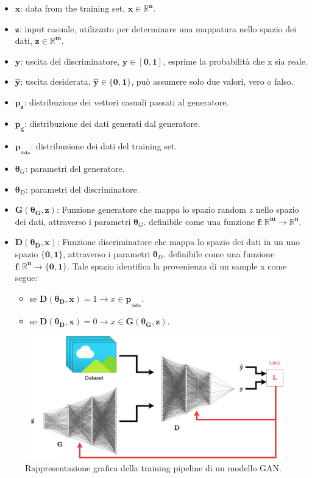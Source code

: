 \begin{itemize}
    \item $\mathbf{x}$: data from the training set, $\mathbf{x \in \mathbb{R}^n}$.
    \item $\mathbf{z}$: input casuale, utilizzato per determinare una mappatura nello spazio dei dati, $\mathbf{z \in \mathbb{R}^m}$.
    \item $\mathbf{y}$: uscita del discriminatore, $\mathbf{y \in [0,1]}$, esprime la probabilità che x sia reale.
    \item $\mathbf{\hat{y}}$: uscita desiderata, $\mathbf{\hat{y} \in \{0,1\}}$, può assumere solo due valori, vero o falso.
    \item $\mathbf{p_z}$: distribuzione dei vettori casuali passati al generatore.
    \item $\mathbf{p_g}$: distribuzione dei dati generati dal generatore.
    \item $\mathbf{p_{_{data}}}$: distribuzione dei dati del training set.
    \item $\mathbf{\theta}_G$: parametri del generatore.
    \item $\mathbf{\theta}_D$: parametri del discriminatore.
    \item $\mathbf{G(\theta_G, z)}$: Funzione generatore che mappa lo spazio random $z$ nello spazio dei dati, attraverso i parametri $\mathbf{\theta}_G$.
    definibile come una funzione $\mathbf{f: \mathbb{R}^m \rightarrow \mathbb{R}^n}$.
    \item $\mathbf{D(\theta_D, x)}$: Funzione discriminatore che mappa lo spazio dei dati in un uno spazio $\mathbf{\{0,1\}}$, attraverso i parametri $\mathbf{\theta}_D$. 
    definibile come una funzione $\mathbf{f:} \mathbf{\mathbb{R}^n \rightarrow \{0,1\}}$. Tale spazio identifica la provenienza di un sample x come segue:
    \begin{itemize}
        \item se $\mathbf{D(\theta_D, x)} = 1 \rightarrow x \in \mathbf{p_{_{data}}}$.
        \item se $\mathbf{D(\theta_D, x)} = 0 \rightarrow x \in \mathbf{G(\theta_G, z)}$.
    \end{itemize}
\end{itemize}

    \begin{figure}[H]
        \centering
        \includegraphics[width=1.0\textwidth]{imgs/GAN_training.png}
        \caption{Rappresentazione grafica della training pipeline di un modello GAN.}
        \label{fig:gan_training}
    \end{figure}


